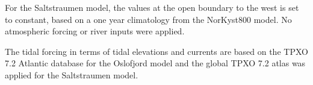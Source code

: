 For the Saltstraumen model, the values at the open boundary to the west is set to constant, based on a one year climatology from the NorKyst800 model. No atmospheric forcing or river inputs were applied.

The tidal forcing in terms of tidal elevations and currents are based on the TPXO 7.2 Atlantic database \cite[]{egbert02} for the Oslofjord model and the global TPXO 7.2 atlas was applied for the Saltstraumen model. 
